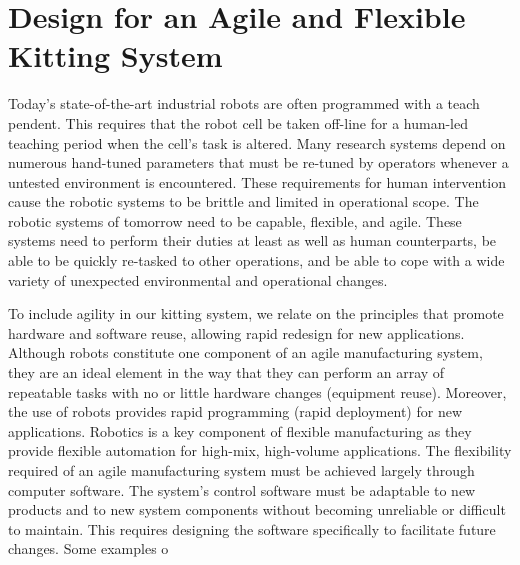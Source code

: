 \documentclass[final,12pt]{elsarticle}
\begin{document}



\section{Design for an Agile and Flexible Kitting System}
\label{Sect:design}

Today's state-of-the-art industrial robots are often programmed with a teach pendent. This requires that the robot cell be taken off-line for a human-led teaching period when the cell's task is altered.  Many research systems depend on numerous hand-tuned parameters that must be re-tuned by operators whenever a untested environment is encountered. These requirements for human intervention cause the robotic systems to be brittle and limited in operational scope. The robotic systems of tomorrow need to be capable, flexible, and agile.  These systems need to perform their duties at least as well as human counterparts, be able to be quickly re-tasked to other operations, and be able to cope with a wide variety of unexpected environmental and operational changes. 

To include agility in our kitting system, we relate on the principles that promote hardware and software reuse, allowing rapid redesign for new applications. Although robots constitute one component of an agile manufacturing system, they are an ideal element in the way that they can perform an array of repeatable tasks with no or little hardware changes (equipment reuse). Moreover, the use of robots provides rapid programming (rapid deployment) for new applications. Robotics is a key component of flexible manufacturing as they provide flexible automation for high-mix, high-volume applications. The flexibility required of an agile manufacturing system must be achieved largely through computer software. The system's control software must be adaptable to new products and to new system components without becoming unreliable or difficult to maintain. This requires designing the software specifically to facilitate future changes. Some examples o
\end{document}
